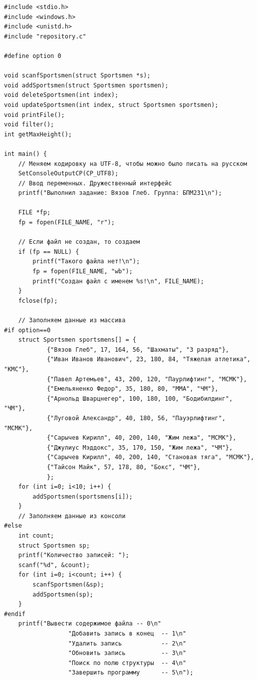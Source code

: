 \documentclass[12pt]{article}
\begin{document}
\begin{lstlisting}[label=structs.h, caption=hw8.c]
#include <stdio.h>
#include <windows.h>
#include <unistd.h>
#include "repository.c"

#define option 0

void scanfSportsmen(struct Sportsmen *s);
void addSportsmen(struct Sportsmen sportsmen);
void deleteSportsmen(int index);
void updateSportsmen(int index, struct Sportsmen sportsmen);
void printFile();
void filter();
int getMaxHeight();

int main() {
    // Меняем кодировку на UTF-8, чтобы можно было писать на русском
    SetConsoleOutputCP(CP_UTF8);
    // Ввод переменных. Дружественный интерфейс
    printf("Выполнил задание: Вязов Глеб. Группа: БПМ231\n");

    FILE *fp;
    fp = fopen(FILE_NAME, "r");

    // Если файл не создан, то создаем
    if (fp == NULL) {
        printf("Такого файла нет!\n");
        fp = fopen(FILE_NAME, "wb");
        printf("Создан файл с именем %s!\n", FILE_NAME);
    }
    fclose(fp);

    // Заполняем данные из массива
#if option==0
    struct Sportsmen sportsmens[] = {
            {"Вязов Глеб", 17, 164, 56, "Шахматы", "3 разряд"},
            {"Иван Иванов Иванович", 23, 180, 84, "Тяжелая атлетика", "КМС"},
            {"Павел Артемьев", 43, 200, 120, "Паурлифтинг", "МСМК"},
            {"Емельяненко Федор", 35, 180, 80, "ММА", "ЧМ"},
            {"Арнольд Шварцнегер", 100, 180, 100, "Бодибилдинг", "ЧМ"},
            {"Луговой Александр", 40, 180, 56, "Пауэрлифтинг", "МСМК"},
            {"Сарычев Кирилл", 40, 200, 140, "Жим лежа", "МСМК"},
            {"Джулиус Мэддокс", 35, 170, 150, "Жим лежа", "ЧМ"},
            {"Сарычев Кирилл", 40, 200, 140, "Становая тяга", "МСМК"},
            {"Тайсон Майк", 57, 178, 80, "Бокс", "ЧМ"},
            };
    for (int i=0; i<10; i++) {
        addSportsmen(sportsmens[i]);
    }
    // Заполняем данные из консоли
#else
    int count;
    struct Sportsmen sp;
    printf("Количество записей: ");
    scanf("%d", &count);
    for (int i=0; i<count; i++) {
        scanfSportsmen(&sp);
        addSportsmen(sp);
    }
#endif
    printf("Вывести содержимое файла -- 0\n"
                  "Добавить запись в конец  -- 1\n"
                  "Удалить запись           -- 2\n"
                  "Обновить запись          -- 3\n"
                  "Поиск по полю структуры  -- 4\n"
                  "Завершить программу      -- 5\n");


\end{lstlisting}
\end{document}
